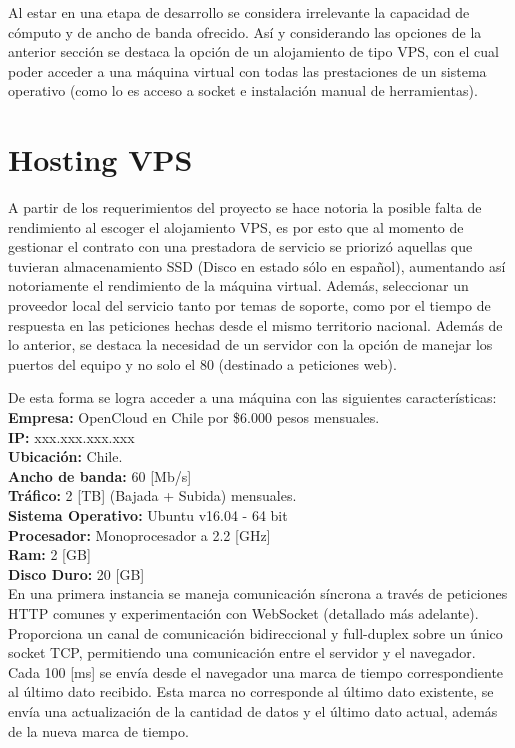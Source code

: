 Al estar en una etapa de desarrollo se considera irrelevante la capacidad de cómputo y de ancho de banda ofrecido. Así y considerando las opciones de la anterior sección se destaca la opción de un alojamiento de tipo VPS, con el cual poder acceder a una máquina virtual con todas las prestaciones de un sistema operativo (como lo es acceso a socket e instalación manual de herramientas).

\newpage
\section{Hosting VPS}

A partir de los requerimientos del proyecto se hace notoria la posible falta de rendimiento al escoger el alojamiento VPS, es por esto que al momento de gestionar el contrato con una prestadora de servicio se priorizó aquellas que tuvieran almacenamiento SSD (Disco en estado sólo en español), aumentando así notoriamente el rendimiento de la máquina virtual. Además, seleccionar un proveedor local del servicio tanto por temas de soporte, como por el tiempo de respuesta en las peticiones hechas desde el mismo territorio nacional. Además de lo anterior, se destaca la necesidad de un servidor con la opción de manejar los puertos del equipo y no solo el 80 (destinado a peticiones web).

De esta forma se logra acceder a una máquina con las siguientes características:
\textbf{Empresa:} OpenCloud en Chile por \$6.000 pesos mensuales.\\ 
\textbf{IP:} xxx.xxx.xxx.xxx\\
\textbf{Ubicación:} Chile.\\
\textbf{Ancho de banda:} 60 [Mb/s]\\
\textbf{Tráfico:} 2 [TB] (Bajada + Subida) mensuales.\\
\textbf{Sistema Operativo:} Ubuntu v16.04 - 64 bit\\
\textbf{Procesador:} Monoprocesador a 2.2 [GHz]\\
\textbf{Ram:} 2 [GB]\\
\textbf{Disco Duro:} 20 [GB]\\
\newpage
En una primera instancia se maneja comunicación síncrona a través de peticiones HTTP comunes y experimentación con WebSocket (detallado más adelante).
Proporciona un canal de comunicación bidireccional y full-duplex sobre un único socket TCP, permitiendo una comunicación entre el servidor y el navegador.
Cada 100 [ms] se envía desde el navegador una marca de tiempo correspondiente al último dato recibido. Esta marca no corresponde al último dato existente, se envía una actualización de la cantidad de datos y el último dato actual, además de la nueva marca de tiempo.

